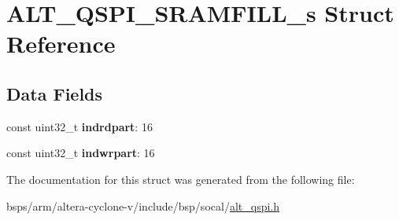 \hypertarget{structALT__QSPI__SRAMFILL__s}{}\section{A\+L\+T\+\_\+\+Q\+S\+P\+I\+\_\+\+S\+R\+A\+M\+F\+I\+L\+L\+\_\+s Struct Reference}
\label{structALT__QSPI__SRAMFILL__s}
\subsection*{Data Fields}
\begin{DoxyCompactItemize}
\item 
\mbox{\label{structALT__QSPI__SRAMFILL__s_a5d9cdf4bad54e24449dfa2bf3cc08995}} 
const uint32\+\_\+t {\bfseries indrdpart}\+: 16
\item 
\mbox{\label{structALT__QSPI__SRAMFILL__s_a83c04a436e874cf110a81cbd6fe46786}} 
const uint32\+\_\+t {\bfseries indwrpart}\+: 16
\end{DoxyCompactItemize}


The documentation for this struct was generated from the following file\+:\begin{DoxyCompactItemize}
\item 
bsps/arm/altera-\/cyclone-\/v/include/bsp/socal/\mbox{\hyperlink{include_2bsp_2socal_2alt__qspi_8h}{alt\+\_\+qspi.\+h}}\end{DoxyCompactItemize}

